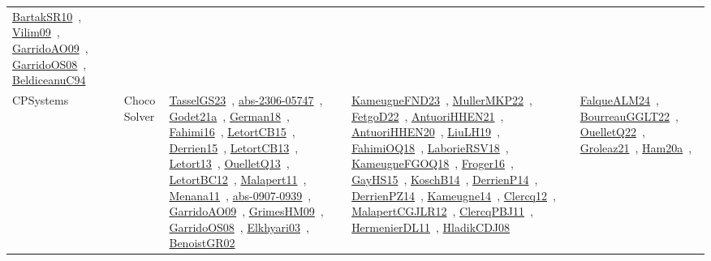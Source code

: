{\begin{longtable}{lp{3cm}>{\raggedright\arraybackslash}p{6cm}>{\raggedright\arraybackslash}p{6cm}>{\raggedright\arraybackslash}p{8cm}}
\href{../works/BartakSR10.pdf}{BartakSR10}~\cite{BartakSR10}, \href{../works/Vilim09.pdf}{Vilim09}~\cite{Vilim09}, \href{../works/GarridoAO09.pdf}{GarridoAO09}~\cite{GarridoAO09}, \href{../works/GarridoOS08.pdf}{GarridoOS08}~\cite{GarridoOS08}, \href{../works/BeldiceanuC94.pdf}{BeldiceanuC94}~\cite{BeldiceanuC94}\\
CPSystems & Choco Solver & \href{../works/TasselGS23.pdf}{TasselGS23}~\cite{TasselGS23}, \href{../works/abs-2306-05747.pdf}{abs-2306-05747}~\cite{abs-2306-05747}, \href{../works/Godet21a.pdf}{Godet21a}~\cite{Godet21a}, \href{../works/German18.pdf}{German18}~\cite{German18}, \href{../works/Fahimi16.pdf}{Fahimi16}~\cite{Fahimi16}, \href{../works/LetortCB15.pdf}{LetortCB15}~\cite{LetortCB15}, \href{../works/Derrien15.pdf}{Derrien15}~\cite{Derrien15}, \href{../works/LetortCB13.pdf}{LetortCB13}~\cite{LetortCB13}, \href{../works/Letort13.pdf}{Letort13}~\cite{Letort13}, \href{../works/OuelletQ13.pdf}{OuelletQ13}~\cite{OuelletQ13}, \href{../works/LetortBC12.pdf}{LetortBC12}~\cite{LetortBC12}, \href{../works/Malapert11.pdf}{Malapert11}~\cite{Malapert11}, \href{../works/Menana11.pdf}{Menana11}~\cite{Menana11}, \href{../works/abs-0907-0939.pdf}{abs-0907-0939}~\cite{abs-0907-0939}, \href{../works/GarridoAO09.pdf}{GarridoAO09}~\cite{GarridoAO09}, \href{../works/GrimesHM09.pdf}{GrimesHM09}~\cite{GrimesHM09}, \href{../works/GarridoOS08.pdf}{GarridoOS08}~\cite{GarridoOS08}, \href{../works/Elkhyari03.pdf}{Elkhyari03}~\cite{Elkhyari03}, \href{../works/BenoistGR02.pdf}{BenoistGR02}~\cite{BenoistGR02} & \href{../works/KameugneFND23.pdf}{KameugneFND23}~\cite{KameugneFND23}, \href{../works/MullerMKP22.pdf}{MullerMKP22}~\cite{MullerMKP22}, \href{../works/FetgoD22.pdf}{FetgoD22}~\cite{FetgoD22}, \href{../works/AntuoriHHEN21.pdf}{AntuoriHHEN21}~\cite{AntuoriHHEN21}, \href{../works/AntuoriHHEN20.pdf}{AntuoriHHEN20}~\cite{AntuoriHHEN20}, \href{../works/LiuLH19.pdf}{LiuLH19}~\cite{LiuLH19}, \href{../works/FahimiOQ18.pdf}{FahimiOQ18}~\cite{FahimiOQ18}, \href{../works/LaborieRSV18.pdf}{LaborieRSV18}~\cite{LaborieRSV18}, \href{../works/KameugneFGOQ18.pdf}{KameugneFGOQ18}~\cite{KameugneFGOQ18}, \href{../works/Froger16.pdf}{Froger16}~\cite{Froger16}, \href{../works/GayHS15.pdf}{GayHS15}~\cite{GayHS15}, \href{../works/KoschB14.pdf}{KoschB14}~\cite{KoschB14}, \href{../works/DerrienP14.pdf}{DerrienP14}~\cite{DerrienP14}, \href{../works/DerrienPZ14.pdf}{DerrienPZ14}~\cite{DerrienPZ14}, \href{../works/Kameugne14.pdf}{Kameugne14}~\cite{Kameugne14}, \href{../works/Clercq12.pdf}{Clercq12}~\cite{Clercq12}, \href{../works/MalapertCGJLR12.pdf}{MalapertCGJLR12}~\cite{MalapertCGJLR12}, \href{../works/ClercqPBJ11.pdf}{ClercqPBJ11}~\cite{ClercqPBJ11}, \href{../works/HermenierDL11.pdf}{HermenierDL11}~\cite{HermenierDL11}, \href{../works/HladikCDJ08.pdf}{HladikCDJ08}~\cite{HladikCDJ08} & \href{../works/FalqueALM24.pdf}{FalqueALM24}~\cite{FalqueALM24}, \href{../works/BourreauGGLT22.pdf}{BourreauGGLT22}~\cite{BourreauGGLT22}, \href{../works/OuelletQ22.pdf}{OuelletQ22}~\cite{OuelletQ22}, \href{../works/Groleaz21.pdf}{Groleaz21}~\cite{Groleaz21}, \href{../works/Ham20a.pdf}{Ham20a}~\cite{Ham20a}, 
\end{longtable}}
